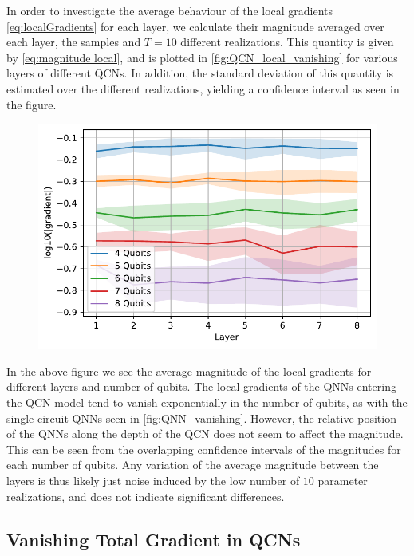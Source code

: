 In order to investigate the average behaviour of the local gradients \autoref{eq:localGradients} for each layer, we calculate their magnitude averaged over each layer, the samples and $T = 10$ different realizations. This quantity is given by \autoref{eq:magnitude local}, and is plotted in \autoref{fig:QCN_local_vanishing} for various layers of different QCNs. In addition, the standard deviation of this quantity is estimated over the different realizations, yielding a confidence interval as seen in the figure. 

\begin{figure}[H]
    \centering
    \includegraphics[width=12cm]{latex/figures/vanishing_gradient_partial_input.pdf}
    \caption{}
    \label{fig:QCN_local_vanishing}
\end{figure}

In the above figure we see the average magnitude of the local gradients for different layers and number of qubits. The local gradients of the QNNs entering the QCN model tend to vanish exponentially in the number of qubits, as with the single-circuit QNNs seen in \autoref{fig:QNN_vanishing}. However, the relative position of the QNNs along the depth of the QCN does not seem to affect the magnitude. This can be seen from the overlapping confidence intervals of the magnitudes for each number of qubits. Any variation of the average magnitude between the layers is thus likely just noise induced by the low number of $10$ parameter realizations, and does not indicate significant differences.  

\subsection{Vanishing Total Gradient in QCNs}\label{sec:Vanishing Total Gradients in QCNs}

